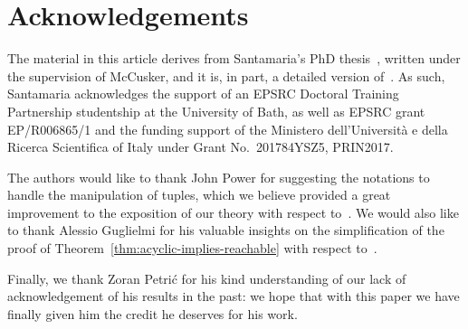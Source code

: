 \section*{Acknowledgements}
The material in this article derives from Santamaria's PhD thesis~\cite{santamaria_towards_2019}, written under the supervision of McCusker, and it is, in part, a detailed version of~\cite{mccusker_compositionality_2018}. As such, Santamaria acknowledges the support of an EPSRC Doctoral Training Partnership studentship at the
University of Bath, as well as EPSRC grant EP/R006865/1 and the funding support of the Ministero dell’Universit\`a e della Ricerca Scientifica of Italy under Grant No.~201784YSZ5, PRIN2017.

The authors would like to thank John Power for suggesting the notations to handle the manipulation of tuples, which we believe provided a great improvement to the exposition of our theory with respect to~\cite{mccusker_compositionality_2018,santamaria_towards_2019}. We would also like to thank Alessio Guglielmi for his valuable insights on the simplification of the proof of Theorem~\ref{thm:acyclic-implies-reachable} with respect to~\cite{mccusker_compositionality_2018,santamaria_towards_2019}.

Finally, we thank Zoran Petri\'c for his kind understanding of our lack of acknowledgement of his results in the past: we hope that with this paper we have finally given him the credit he deserves for his work.